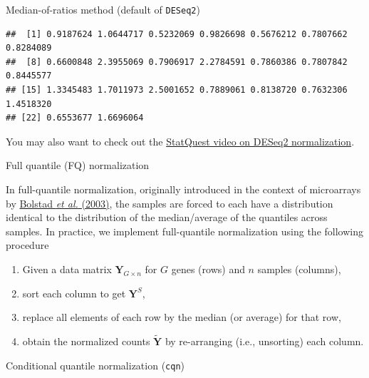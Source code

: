 \documentclass[ignorenonframetext,]{beamer}
\providecommand{\tightlist}{%
  \setlength{\itemsep}{0pt}\setlength{\parskip}{0pt}}
\begin{document}
\begin{frame}[fragile]
\begin{block}{Median-of-ratios method (default of \texttt{DESeq2})}
\begin{verbatim}
##  [1] 0.9187624 1.0644717 0.5232069 0.9826698 0.5676212 0.7807662 0.8284089
##  [8] 0.6600848 2.3955069 0.7906917 2.2784591 0.7860386 0.7807842 0.8445577
## [15] 1.3345483 1.7011973 2.5001652 0.7889061 0.8138720 0.7632306 1.4518320
## [22] 0.6553677 1.6696064
\end{verbatim}

You may also want to check out the
\href{https://www.youtube.com/watch?v=UFB993xufUU}{StatQuest video on
DESeq2 normalization}.

\end{block}

\begin{block}{Full quantile (FQ) normalization}

In full-quantile normalization, originally introduced in the context of
microarrays by
\href{https://academic.oup.com/bioinformatics/article/19/2/185/372664}{Bolstad
\emph{et al.} (2003)}, the samples are forced to each have a
distribution identical to the distribution of the median/average of the
quantiles across samples. In practice, we implement full-quantile
normalization using the following procedure

\begin{enumerate}
\tightlist
\item
  Given a data matrix \(\mathbf{Y}_{G \times n}\) for \(G\) genes (rows)
  and \(n\) samples (columns),
\item
  sort each column to get \(\mathbf{Y}^S\),
\item
  replace all elements of each row by the median (or average) for that
  row,
\item
  obtain the normalized counts \(\tilde{\mathbf{Y}}\) by re-arranging
  (i.e., unsorting) each column.
\end{enumerate}

\end{block}

\begin{block}{Conditional quantile normalization (\texttt{cqn})}


\end{block}
\end{frame}
\end{document}
